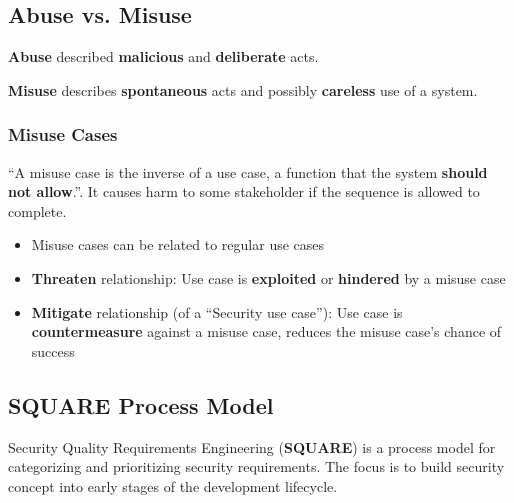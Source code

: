 \documentclass[12pt,A4]{extarticle}
\newcommand{\highlight}[1]{\textcolor{highlightColor}{\textbf{#1}}}
\begin{document}
\newpage
\subsection{Abuse vs. Misuse}
\highlight{Abuse} described \textbf{malicious} and \textbf{deliberate} acts.\par
\highlight{Misuse} describes \textbf{spontaneous} acts and possibly \textbf{careless} use of a system.\par

\subsubsection{Misuse Cases}
``A misuse case is the inverse of a use case, a function that the system \textbf{should not allow}.''. It causes harm to some stakeholder if the sequence is allowed to complete.

\begin{itemize}
  \item{Misuse cases can be related to regular use cases}
  \item{\textbf{Threaten} relationship: Use case is \textbf{exploited} or \textbf{hindered} by a misuse case}
  \item{\textbf{Mitigate} relationship (of a ``Security use case''): Use case is \textbf{countermeasure} against a misuse case, reduces the misuse case's chance of success}
\end{itemize}

\subsection{SQUARE Process Model}
Security Quality Requirements Engineering (\highlight{SQUARE}) is a process model for categorizing and prioritizing security requirements. The focus is to build security concept into early stages of the development lifecycle.
\end{document}
